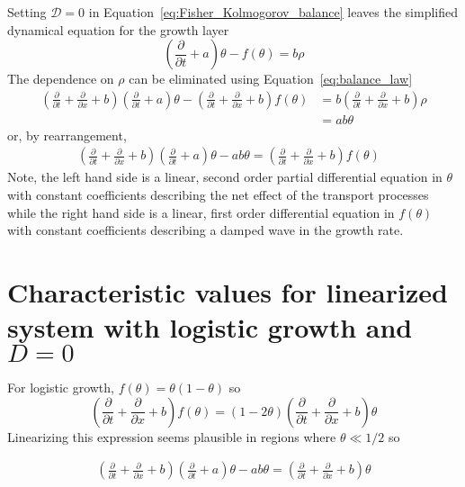 \documentclass[12pt]{amsart}
\begin{document}
Setting $\mathcal{D}=0$ in
Equation~\ref{eq:Fisher_Kolmogorov_balance} leaves
the simplified dynamical equation for the growth layer
\begin{equation}
  \left(\frac{\partial}{\partial t}+a\right)\theta
  - f(\theta) = b\rho\label{eq:growth_alone}
\end{equation}
The dependence on $\rho$ can be eliminated using Equation~\ref{eq:balance_law}
\begin{align}
  \left(\frac{\partial}{\partial t} + \frac{\partial}{\partial x} + b\right)\left(
  \frac{\partial}{\partial t}+a\right)\theta -
  \left(\frac{\partial}{\partial t} + \frac{\partial}{\partial x} + b\right)f(\theta) &
  = b\left(\frac{\partial}{\partial t} + \frac{\partial}{\partial x} + b\right)\rho \\ &
  = ab\theta
  \label{eq:fixed_point_formulation}
\end{align}
or, by rearrangement,
\begin{align}
  \left(\frac{\partial}{\partial t} + \frac{\partial}{\partial x} + b\right)\left(
  \frac{\partial}{\partial t}+a\right)\theta - ab\theta
  = \left(\frac{\partial}{\partial t} + \frac{\partial}{\partial x} + b\right)f(\theta) &
  \label{eq:linear_nonlinear_balance}
\end{align}
Note, the left hand side is a linear, second order partial
differential equation in $\theta$ with constant coefficients
describing the net effect of the transport processes while the right
hand side is a linear, first order differential equation in
$f(\theta)$ with constant coefficients describing a damped wave in the
growth rate.



\section{Characteristic values for linearized system with logistic growth and $D=0$}

For logistic growth, $f(\theta) = \theta(1-\theta)$ so
\begin{equation}
  \left(\frac{\partial}{\partial t} + \frac{\partial}{\partial x} + b\right)f(\theta) = 
\left(1-2\theta\right)\left(\frac{\partial}{\partial t} + \frac{\partial}{\partial x} + b\right)\theta 
\end{equation}
Linearizing this expression seems plausible in regions where $\theta
\ll 1/2$ so

\begin{align}
  \left(\frac{\partial}{\partial t} + \frac{\partial}{\partial x} + b\right)\left(
  \frac{\partial}{\partial t}+a\right)\theta - ab\theta
  = \left(\frac{\partial}{\partial t} + \frac{\partial}{\partial x} + b\right)\theta
  \label{eq:linearized_logistic_theta}
\end{align}
\end{document}

